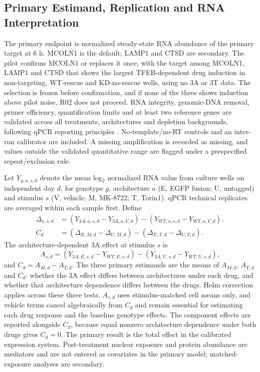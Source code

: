 \subsection{Primary Estimand, Replication and RNA Interpretation}
The primary endpoint is normalized steady-state RNA abundance of the primary target at 6 h. MCOLN1 is the default; LAMP1 and CTSD are secondary. The pilot confirms MCOLN1 or replaces it once, with the target among MCOLN1, LAMP1 and CTSD that shows the largest TFEB-dependent drug induction in non-targeting, WT-rescue and KD-no-rescue wells, using no 3A or 3T data. The selection is frozen before confirmation, and if none of the three shows induction above pilot noise, R02 does not proceed. RNA integrity, genomic-DNA removal, primer efficiency, quantification limits and at least two reference genes are validated across all treatments, architectures and depletion backgrounds, following qPCR reporting principles \cite{Bustin2009}. No-template/no-RT controls and an inter-run calibrator are included. A missing amplification is recorded as missing, and values outside the validated quantitative range are flagged under a prespecified repeat/exclusion rule.

Let $Y_{g,a,s,d}$ denote the mean log$_2$ normalized RNA value from culture wells on independent day $d$, for genotype $g$, architecture $a$ (E, EGFP fusion; U, untagged) and stimulus $s$ (V, vehicle; M, MK-8722; T, Torin1). qPCR technical replicates are averaged within each sample first. Define
\begin{align}
\Delta_{a,s,d}&=(Y_{3A,a,s,d}-Y_{3A,a,V,d})-(Y_{WT,a,s,d}-Y_{WT,a,V,d}),\\
C_d&=(\Delta_{E,M,d}-\Delta_{U,M,d})-(\Delta_{E,T,d}-\Delta_{U,T,d}).
\end{align}
The architecture-dependent 3A effect at stimulus $s$ is
\begin{equation}
A_{s,d}=(Y_{3A,E,s,d}-Y_{WT,E,s,d})-(Y_{3A,U,s,d}-Y_{WT,U,s,d}),
\end{equation}
and $C_d=A_{M,d}-A_{T,d}$. The three primary estimands are the means of $A_{M,d}$, $A_{T,d}$ and $C_d$: whether the 3A effect differs between architectures under each drug, and whether that architecture dependence differs between the drugs. Holm correction applies across these three tests. $A_{s,d}$ uses stimulus-matched cell means only, and vehicle terms cancel algebraically from $C_d$ and remain essential for estimating each drug response and the baseline genotype effects. The component effects are reported alongside $C_d$, because equal nonzero architecture dependence under both drugs gives $C_d=0$. The primary result is the total effect in the calibrated expression system. Post-treatment nuclear exposure and protein abundance are mediators and are not entered as covariates in the primary model; matched-exposure analyses are secondary.

